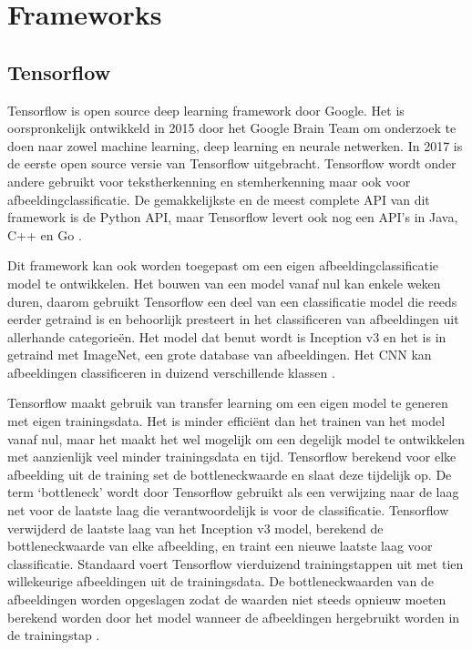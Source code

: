 \section{Frameworks}
\label{sec:Frameworks}

\subsection{Tensorflow}
\label{ssec:Tensorflow}

Tensorflow is open source deep learning framework door Google. Het is oorspronkelijk ontwikkeld in 2015 door het Google Brain Team om onderzoek te doen naar zowel machine learning, deep learning en neurale netwerken. In 2017 is de eerste open source versie van Tensorflow uitgebracht. Tensorflow wordt onder andere gebruikt voor tekstherkenning en stemherkenning maar ook voor afbeeldingclassificatie. De gemakkelijkste en de meest complete API van dit framework is de Python API, maar Tensorflow levert ook nog een API’s in Java, C++ en Go \autocite{introTensorflow}.

Dit framework kan ook worden toegepast om een eigen afbeeldingclassificatie model te ontwikkelen. Het bouwen van een model vanaf nul kan enkele weken duren, daarom gebruikt Tensorflow een deel van een classificatie model die reeds eerder getraind is en behoorlijk presteert in het classificeren van afbeeldingen uit allerhande categorieën. Het model dat benut wordt is Inception v3 en het is in getraind met ImageNet, een grote database van afbeeldingen. Het CNN kan afbeeldingen classificeren in duizend verschillende klassen \autocite{Tensorflow}.

Tensorflow maakt gebruik van transfer learning om een eigen model te generen met eigen trainingsdata. Het is minder efficiënt dan het trainen van het model vanaf nul, maar het maakt het wel mogelijk om een degelijk model te ontwikkelen met aanzienlijk veel minder trainingsdata en tijd. Tensorflow berekend voor elke afbeelding uit de training set de bottleneckwaarde en slaat deze tijdelijk op. De term ‘bottleneck’ wordt door Tensorflow gebruikt als een verwijzing naar de laag net voor de laatste laag die verantwoordelijk is voor de classificatie. Tensorflow verwijderd de laatste laag van het Inception v3 model, berekend de bottleneckwaarde van elke afbeelding, en traint een nieuwe laatste laag voor classificatie. Standaard voert Tensorflow vierduizend trainingstappen uit met tien willekeurige afbeeldingen uit de trainingsdata. De bottleneckwaarden van de afbeeldingen worden opgeslagen zodat de waarden niet steeds opnieuw moeten berekend worden door het model wanneer de afbeeldingen hergebruikt worden in de trainingstap \autocite{deeplearningTensor}.

